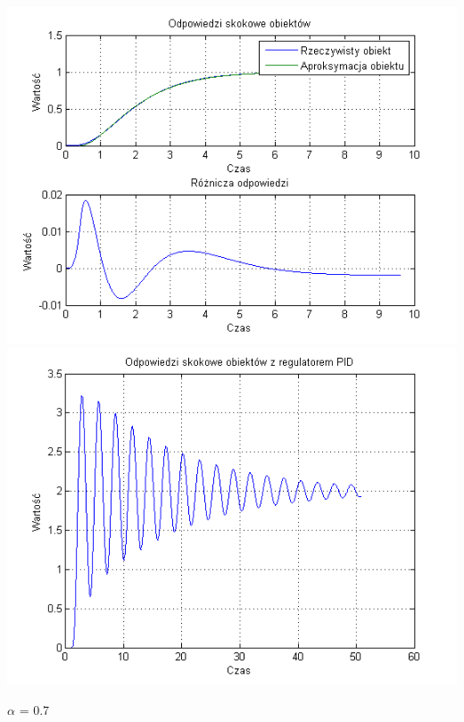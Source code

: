 \documentclass[10pt,a4paper]{article}
\begin{document}
\begin{center}
\includegraphics[scale=1]{images/dwa/skrypt_127.png}\\
\includegraphics[scale=1]{images/dwa/skrypt_128.png}\\
\end{center}
\newpage
$\alpha$ = 0.7
\end{document}
